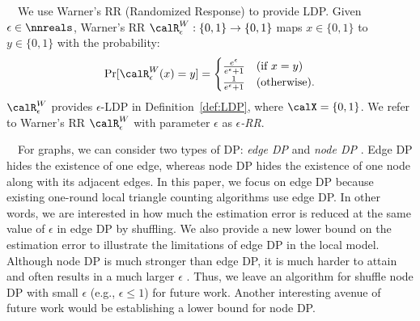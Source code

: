 \smallskip
{}~~We use Warner's RR (Randomized Response) \cite{Warner_JASA65} to provide 
LDP. 
Given $\epsilon \in \nnreals$, Warner's RR $\calR_{\epsilon}^W: \{0,1\} \rightarrow \{0,1\}$ maps $x \in \{0,1\}$ to $y \in \{0,1\}$ with the probability: 
\begin{align*}
    \Pr[\calR_{\epsilon}^W(x) = y] = 
    \begin{cases}
    \frac{e^\epsilon}{e^\epsilon + 1}   &   \text{(if $x=y$)} \\
    \frac{1}{e^\epsilon + 1}   &   \text{(otherwise)}.
    \end{cases}
\end{align*}
$\calR_{\epsilon}^W$ 
provides $\epsilon$-LDP in Definition~\ref{def:LDP}, where $\calX = \{0,1\}$. 
We refer to Warner's RR $\calR_{\epsilon}^W$ with parameter $\epsilon$ as \textit{$\epsilon$-RR}. 


\smallskip
{}~~For graphs, we can consider two types of DP: 
\textit{edge DP} and \textit{node DP} \cite{Hay_ICDM09,Raskhodnikova_Encyclopedia16}. 
Edge DP hides the existence of one edge, whereas node DP hides the existence of one node along with its adjacent edges. 
In this paper, we focus on edge DP because existing one-round local triangle counting algorithms \cite{Imola_USENIX21,Imola_USENIX22,Ye_ICDE20,Ye_TKDE21} use edge DP. 
In other words, we are interested in 
how much the estimation error is reduced at the same value of $\epsilon$ in edge DP by shuffling. 
We also provide a new lower bound on the estimation error to illustrate the limitations of edge DP in the local model. 
Although node DP is much stronger than edge DP, it is much harder to attain and often results in a much larger $\epsilon$ \cite{Chen_SIGMOD13,Sajadmanesh_arXiv22}. 
Thus, we leave an algorithm for shuffle node DP with small $\epsilon$ (e.g., $\epsilon \leq 1$) for future work. 
Another interesting avenue of future work would be establishing a lower bound for node DP. 

